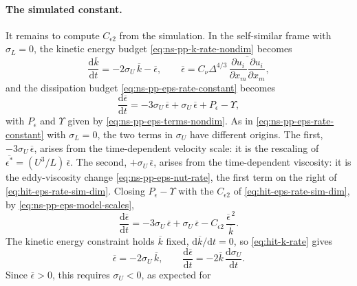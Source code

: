 \documentclass{article}
\begin{document}
\paragraph{The simulated constant.}
It remains to compute $C_{\epsilon 2}$ from the simulation. In the
self-similar frame with $\sigma_L = 0$, the kinetic energy budget
\eqref{eq:ns-pp-k-rate-nondim} becomes
\begin{equation}\label{eq:hit-k-rate}
  \frac{\mathrm{d} \overline{k}}{\mathrm{d} t}
  = -2\sigma_U\, \overline{k} - \overline{\epsilon},
  \qquad
  \overline{\epsilon} = C_\nu \Delta^{4/3}\, \overline{\frac{\partial u_i}{\partial x_m} \frac{\partial u_i}{\partial x_m}},
\end{equation}
and the dissipation budget \eqref{eq:ns-pp-eps-rate-constant} becomes
\begin{equation}\label{eq:hit-eps-rate}
  \frac{\mathrm{d} \overline{\epsilon}}{\mathrm{d} t}
  = -3\sigma_U\, \overline{\epsilon} + \sigma_U\, \overline{\epsilon}
  + P_\epsilon - \Upsilon ,
\end{equation}
with $P_\epsilon$ and $\Upsilon$ given by \eqref{eq:ns-pp-eps-terms-nondim}.
As in \eqref{eq:ns-pp-eps-rate-constant} with $\sigma_L = 0$, the two terms
in $\sigma_U$ have different origins. The first, $-3\sigma_U\,
\overline{\epsilon}$, arises from the time-dependent velocity scale: it is the
rescaling of $\overline{\epsilon^*} = (U^3/L)\, \overline{\epsilon}$. The
second, $+\sigma_U\, \overline{\epsilon}$, arises from the time-dependent
viscosity: it is the eddy-viscosity change \eqref{eq:ns-pp-eps-nut-rate}, the
first term on the right of \eqref{eq:hit-eps-rate-sim-dim}. Closing
$P_\epsilon - \Upsilon$ with the $C_{\epsilon 2}$ of
\eqref{eq:hit-eps-rate-sim-dim}, by \eqref{eq:ns-pp-eps-model-scales},
\begin{equation}\label{eq:hit-eps-rate-model}
  \frac{\mathrm{d} \overline{\epsilon}}{\mathrm{d} t}
  = -3\sigma_U\, \overline{\epsilon} + \sigma_U\, \overline{\epsilon}
  - C_{\epsilon 2}\, \frac{\overline{\epsilon}^{\,2}}{\overline{k}} .
\end{equation}
The kinetic energy constraint holds $\overline{k}$ fixed,
$\mathrm{d}\overline{k}/\mathrm{d}t = 0$, so \eqref{eq:hit-k-rate} gives
\begin{equation}\label{eq:hit-eps-sigmaU}
  \overline{\epsilon} = -2\sigma_U\, \overline{k},
  \qquad
  \frac{\mathrm{d} \overline{\epsilon}}{\mathrm{d} t} = -2\overline{k}\, \frac{\mathrm{d} \sigma_U}{\mathrm{d} t} .
\end{equation}
Since $\overline{\epsilon} > 0$, this requires $\sigma_U < 0$, as expected for
\end{document}
